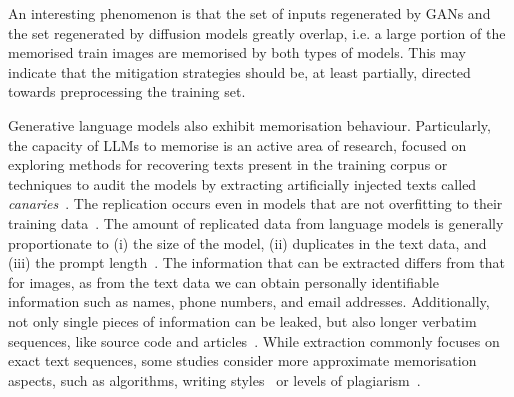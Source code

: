 \documentclass[conference,table]{IEEEtran} %
\begin{document}
An interesting phenomenon is that the set of inputs regenerated by GANs and the set regenerated by diffusion models greatly overlap, i.e. a large portion of the memorised train images are memorised by both types of models. This may 
indicate that the mitigation strategies should be, at least partially, directed towards preprocessing the training set.

Generative language models also exhibit memorisation behaviour. Particularly, the capacity of LLMs to memorise is an active area of research, focused on exploring methods for recovering texts present in the training corpus or techniques to audit the models by extracting artificially injected texts called \textit{canaries}~\cite{carlini_secret_2019}. The replication occurs even in models that are not overfitting to their training data~\cite{tirumala_memorization_2022,jagielski_measuring_2023}. 
The amount of replicated data from language models is generally proportionate to (i) the size of the model, (ii) duplicates in the text data, and (iii) the prompt length~\cite{carlini_quantifying_2023,carlini_extracting_2021}. The information that can be extracted differs from that for images, as from the text data we can obtain personally identifiable information such as names, phone numbers, and email addresses. Additionally, not only single pieces of information can be leaked, but also longer verbatim sequences, like source code and articles~\cite{carlini_extracting_2021}. While extraction commonly focuses on exact text sequences, some studies consider more approximate memorisation aspects, such as algorithms, writing styles~\cite{hartmann_sok_2023} or levels of plagiarism~\cite{lee_language_2023}.

\end{document}
